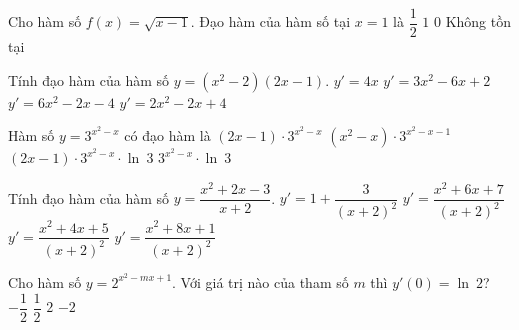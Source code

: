 \begin{ex}%
	Cho hàm số $f(x)=\sqrt{x-1}$. Đạo hàm của hàm số tại $x=1$  là
	\choice 
		 {$\dfrac{1}{2}$}
		 {$1$}
		 {$0$}
		{\True Không tồn tại} 
\end{ex}

\begin{ex}%
	Tính đạo hàm của  hàm số $y=\left(x^2-2\right)(2x-1)$.
	 \choice
		 {$y'=4x$}
		{$y'=3x^2-6x+2$} 
		 {\True $y'=6x^2-2x-4$}
		 {$y'=2x^2-2x+4$}
\end{ex}

\begin{ex}%
	Hàm số $y=3^{x^{2}-x}$ có đạo  hàm là
	 \choice
		{$(2x-1) \cdot  3^{x^{2}-x}$}
		{$(x^{2}-x) \cdot 3^{x^{2}-x-1}$} 
		{\True $(2x-1)  \cdot 3^{x^{2}-x} \cdot \ln~3$}
		{$3^{x^{2}-x}  \cdot \ln~3$}
\end{ex}

\begin{ex}%
	 Tính đạo hàm của hàm số $y=\dfrac{x^2+2x-3}{x+2}$.
	\choice 
		 {\True $y'=1+\dfrac{3}{(x+2)^2}$}
		 {$y'=\dfrac{x^2+6x+7}{(x+2)^2}$}
		 {$y'=\dfrac{x^2+4x+5}{(x+2)^2}$}
		 {$y'=\dfrac{x^2+8x+1}{(x+2)^2}$}
\end{ex}

\begin{ex}%
	Cho hàm số $y=2^{x^{2}-mx+1}$. Với  giá trị nào của tham số $m$ thì $y'(0)=\ln~2$?
	\choice 
		{\True  $-\dfrac{1}{2}$}
		 {$\dfrac{1}{2}$}
		 {$2$}
		{$-2$} 
\end{ex}

